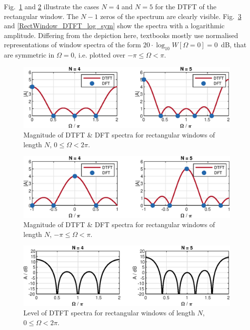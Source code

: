 \documentclass[11pt,a4paper,DIV=12]{scrartcl}
\begin{document}
Fig.~\ref{RectWindow_DTFT_DFT_lin_asym} and \ref{RectWindow_DTFT_DFT_lin_sym}
illustrate the cases $N=4$ and $N=5$ for the DTFT of the rectangular window.
%
The $N-1$ zeros of the spectrum are clearly visible.
%
Fig.~\ref{RectWindow_DTFT_log_asym} and \ref{RectWindow_DTFT_log_sym} show the
spectra with a logarithmic amplitude.
%
Differing from the depiction here, textbooks mostly use normalised representations
of window spectra of the form $20\cdot\log_{10}W[\Omega=0]=0$~dB, that are
symmetric in $\Omega=0$, i.e. plotted over $-\pi\leq\Omega<\pi$.
%
\begin{figure}
		\centering
		\includegraphics[]{graphics/RectWindow_DTFT_DFT_lin_asym}
		\caption{Magnitude of DTFT \& DFT spectra for rectangular windows of length
		$N$, $0\leq\Omega<2\pi$.}
		\label{RectWindow_DTFT_DFT_lin_asym}
\end{figure}
\begin{figure}
		\centering
		\includegraphics[]{graphics/RectWindow_DTFT_DFT_lin_sym}
		\caption{Magnitude of DTFT \& DFT spectra for rectangular windows of length
		$N$, $-\pi\leq\Omega<\pi$.}
		\label{RectWindow_DTFT_DFT_lin_sym}
\end{figure}
\begin{figure}
		\centering
		\includegraphics[]{graphics/RectWindow_DTFT_log_asym}
		\caption{Level of DTFT spectra for rectangular windows of length $N$,
		$0\leq\Omega<2\pi$.}
		\label{RectWindow_DTFT_log_asym}
\end{figure}
\end{document}
